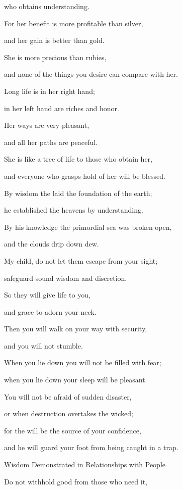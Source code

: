 {who obtains
understanding.
\par }{\Q {}For
her benefit
is more profitable
than silver,
\par }{\Q and her gain
is better than gold.
\par }{\Q {}She is
more precious
than rubies,
\par }{\Q and none
of the things you desire
can compare with her.
\par }{\Q {}Long
life
is in her right hand;
\par }{\Q in her left hand
are riches
and honor.
\par }{\Q {}Her
ways
are very pleasant,
\par }{\Q and all
her paths
are peaceful.
\par }{\Q {}She is like a tree
of life
to those who obtain
her,

\par }{\Q and everyone who grasps hold
of her will be blessed.
\par }{\Q {}By wisdom
the {}
laid the foundation
of the earth;
\par }{\Q he established
the heavens
by understanding.
\par }{\Q {}By his knowledge
the primordial sea
was broken
open,

\par }{\Q and the clouds
drip down
dew.
\par }{\Q {}My child,
do not
let
them escape
from your sight;
\par }{\Q safeguard
sound wisdom
and discretion.
\par }{\Q {}So they will
give life
to you,

\par }{\Q and grace
to adorn your neck.
\par }{\Q {}Then
you will walk
on your
way
with security,
\par }{\Q and you will not
stumble.
\par }{\Q {}When
you lie
down you will not
be filled
with fear;
\par }{\Q when you lie
down your sleep
will be pleasant.
\par }{\Q {}You will not
be afraid
of sudden
disaster,
\par }{\Q or when
destruction
overtakes
the wicked;
\par }{\Q {}for
the {}
will be
the source of your confidence,
\par }{\Q and he will guard
your foot
from being caught in a trap.
\par }{\SH Wisdom Demonstrated in Relationships with People
\par }{\Q {}Do not
withhold
good
from those who need
it,

}

